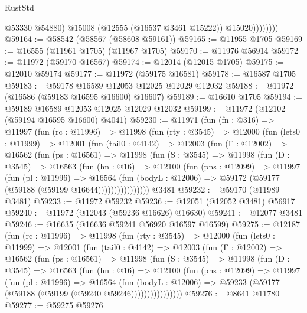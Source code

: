 \begin{lexlean}{RustStd}
\begin{coremodule}
                      @53330
                      @54880)
                    @15008
                    (@12555 (@16537 @3461 @15222))
                    @15020))))))))
@59164 := @58542 (@58567 (@58608 @59161))
@59165 := @11955 @1705
@59169 := @16555 (@11961 @1705) (@11967 @1705)
@59170 := @11976 @56914
@59172 := @11972 (@59170 @16567)
@59174 := @12014 (@12015 @1705)
@59175 := @12010 @59174
@59177 := @11972 (@59175 @16581)
@59178 := @16587 @1705
@59183 := @59178 @16589 @12053 @12025 @12029 @12032
@59188 := @11972 (@16586 (@59183 @16595 @16600) @16607)
@59189 := @16610 @1705
@59194 := @59189 @16589 @12053 @12025 @12029 @12032
@59199 := @11972 (@12102 (@59194 @16595 @16600) @4041)
@59230 := @11971
    (fun (fn : @316) =>
    @11997
      (fun (rc : @11996) =>
      @11998
        (fun (rty : @3545) =>
        @12000
          (fun (lets0 : @11999) =>
          @12001
            (fun (tail0 : @4142) =>
            @12003
              (fun (Γ : @12002) =>
              @16562
                (fun (ps : @16561) =>
                @11998
                  (fun (S : @3545) =>
                  @11998
                    (fun (D : @3545) =>
                    @16563
                      (fun (hn : @16) =>
                      @12100
                        (fun (pns : @12099) =>
                        @11997
                          (fun (pl : @11996) =>
                          @16564
                            (fun (bodyL : @12006) =>
                            @59172 (@59177 (@59188 (@59199 @16644))))))))))))))))
    @3481
@59232 := @59170 (@11989 @3481)
@59233 := @11972 @59232
@59236 := @12051 (@12052 @3481) @56917
@59240 := @11972 (@12043 (@59236 @16626) @16630)
@59241 := @12077 @3481
@59246 := @16635 (@16636 @59241 @56920 @16597 @16599)
@59275 := @12187
    (fun (rc : @11996) =>
    @11998
      (fun (rty : @3545) =>
      @12000
        (fun (lets0 : @11999) =>
        @12001
          (fun (tail0 : @4142) =>
          @12003
            (fun (Γ : @12002) =>
            @16562
              (fun (ps : @16561) =>
              @11998
                (fun (S : @3545) =>
                @11998
                  (fun (D : @3545) =>
                  @16563
                    (fun (hn : @16) =>
                    @12100
                      (fun (pns : @12099) =>
                      @11997
                        (fun (pl : @11996) =>
                        @16564
                          (fun (bodyL : @12006) =>
                          @59233 (@59177 (@59188 (@59199 (@59240 @59246))))))))))))))))
@59276 := @8641 @11780
@59277 := @59275 @59276

\end{coremodule}
\end{lexlean}
